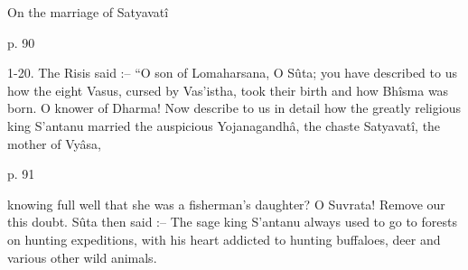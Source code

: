 ﻿On the marriage of Satyavatî

 

p. 90

 

 

1-20. The Risis said :-- “O son of Lomaharsana, O Sûta; you have described to us how the eight Vasus, cursed by Vas'istha, took their birth and how Bhîsma was born. O knower of Dharma! Now describe to us in detail how the greatly religious king S’antanu married the auspicious Yojanagandhâ, the chaste Satyavatî, the mother of Vyâsa,

 

p. 91

 

knowing full well that she was a fisherman's daughter? O Suvrata! Remove our this doubt. Sûta then said :-- The sage king S’antanu always used to go to forests on hunting expeditions, with his heart addicted to hunting buffaloes, deer and various other wild animals.

 

